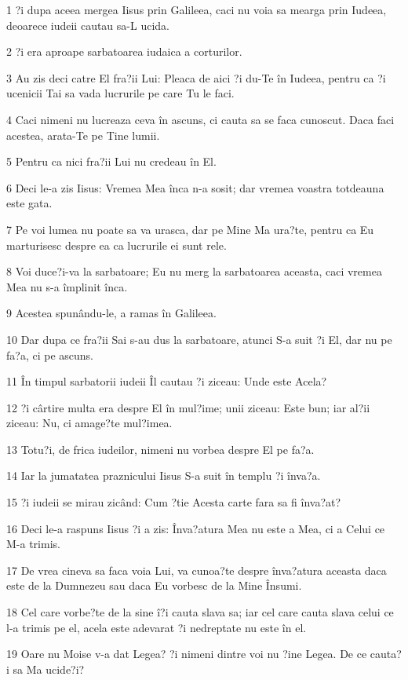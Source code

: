 \par 1 ?i dupa aceea mergea Iisus prin Galileea, caci nu voia sa mearga prin Iudeea, deoarece iudeii cautau sa-L ucida.
\par 2 ?i era aproape sarbatoarea iudaica a corturilor.
\par 3 Au zis deci catre El fra?ii Lui: Pleaca de aici ?i du-Te în Iudeea, pentru ca ?i ucenicii Tai sa vada lucrurile pe care Tu le faci.
\par 4 Caci nimeni nu lucreaza ceva în ascuns, ci cauta sa se faca cunoscut. Daca faci acestea, arata-Te pe Tine lumii.
\par 5 Pentru ca nici fra?ii Lui nu credeau în El.
\par 6 Deci le-a zis Iisus: Vremea Mea înca n-a sosit; dar vremea voastra totdeauna este gata.
\par 7 Pe voi lumea nu poate sa va urasca, dar pe Mine Ma ura?te, pentru ca Eu marturisesc despre ea ca lucrurile ei sunt rele.
\par 8 Voi duce?i-va la sarbatoare; Eu nu merg la sarbatoarea aceasta, caci vremea Mea nu s-a împlinit înca.
\par 9 Acestea spunându-le, a ramas în Galileea.
\par 10 Dar dupa ce fra?ii Sai s-au dus la sarbatoare, atunci S-a suit ?i El, dar nu pe fa?a, ci pe ascuns.
\par 11 În timpul sarbatorii iudeii Îl cautau ?i ziceau: Unde este Acela?
\par 12 ?i cârtire multa era despre El în mul?ime; unii ziceau: Este bun; iar al?ii ziceau: Nu, ci amage?te mul?imea.
\par 13 Totu?i, de frica iudeilor, nimeni nu vorbea despre El pe fa?a.
\par 14 Iar la jumatatea praznicului Iisus S-a suit în templu ?i înva?a.
\par 15 ?i iudeii se mirau zicând: Cum ?tie Acesta carte fara sa fi înva?at?
\par 16 Deci le-a raspuns Iisus ?i a zis: Înva?atura Mea nu este a Mea, ci a Celui ce M-a trimis.
\par 17 De vrea cineva sa faca voia Lui, va cunoa?te despre înva?atura aceasta daca este de la Dumnezeu sau daca Eu vorbesc de la Mine Însumi.
\par 18 Cel care vorbe?te de la sine î?i cauta slava sa; iar cel care cauta slava celui ce l-a trimis pe el, acela este adevarat ?i nedreptate nu este în el.
\par 19 Oare nu Moise v-a dat Legea? ?i nimeni dintre voi nu ?ine Legea. De ce cauta?i sa Ma ucide?i?
